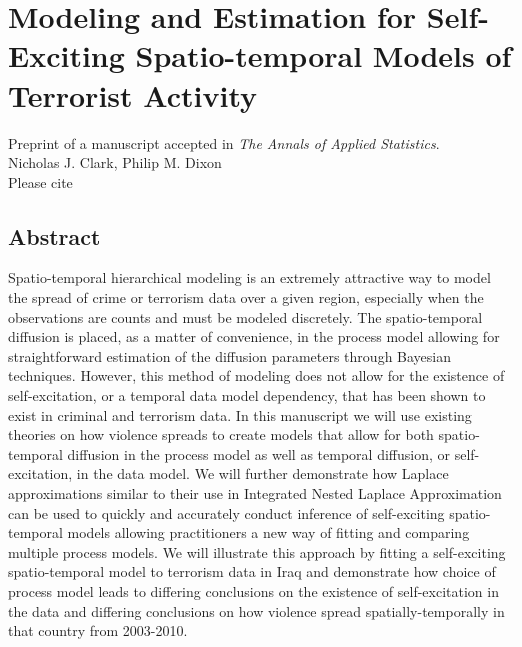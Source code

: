 \documentclass[11pt]{isuthesis}
\begin{document}
\chapter{Modeling and Estimation for Self-Exciting Spatio-temporal Models of Terrorist Activity}\label{AoAS}
\begin{center}
	Preprint of a manuscript accepted in \textit{The Annals of Applied Statistics}.\\
	Nicholas J. Clark, Philip M. Dixon\\
	Please cite \cite{2017arXiv170308429C}
\end{center}
\section*{Abstract}
Spatio-temporal hierarchical modeling is an extremely attractive way to model the spread of crime or terrorism data over a given region, especially when the observations are counts and must be modeled discretely.  The spatio-temporal diffusion is placed, as a matter of convenience, in the process model allowing for straightforward estimation of the diffusion parameters through Bayesian techniques.  However, this method of modeling does not allow for the existence of self-excitation, or a temporal data model dependency, that has been shown to exist in criminal and terrorism data.  In this manuscript we will use existing theories on how violence spreads to create models that allow for both spatio-temporal diffusion in the process model as well as temporal diffusion, or self-excitation, in the data model.  We will further demonstrate how Laplace approximations similar to their use in Integrated Nested Laplace Approximation can be used to quickly and accurately conduct inference of self-exciting spatio-temporal models allowing practitioners a new way of fitting and comparing multiple process models.  We will illustrate this approach by fitting a self-exciting spatio-temporal model to terrorism data in Iraq and demonstrate how choice of process model leads to differing conclusions on the existence of self-excitation in the data and differing conclusions on how violence spread spatially-temporally in that country from 2003-2010.
\end{document}
